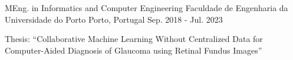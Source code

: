 

\begin{cventries}

  \cventry
    {MEng. in Informatics and Computer Engineering} %
    {Faculdade de Engenharia da Universidade do Porto} %
    {Porto, Portugal} %
    {Sep. 2018 - Jul. 2023} %
    {
      \begin{cvitems} %
        \item {Thesis: ``Collaborative Machine Learning Without Centralized Data for Computer-Aided Diagnosis of Glaucoma using Retinal Fundus Images''}
      \end{cvitems}
    }

\end{cventries}
